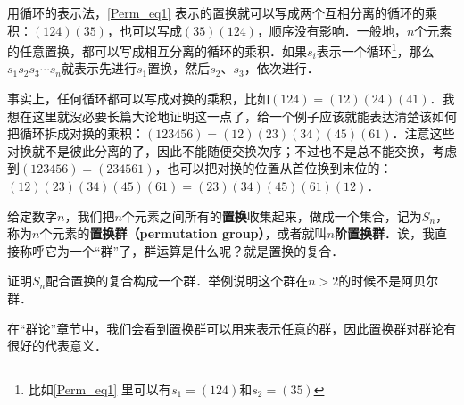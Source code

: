 用循环的表示法，\autoref{Perm_eq1}  表示的置换就可以写成两个互相分离的循环的乘积：$(1 2 4)(3 5)$，也可以写成$(3 5 )(1 2 4)$，顺序没有影响．一般地，$n$个元素的任意置换，都可以写成相互分离的循环的乘积．如果$s_i$表示一个循环\footnote{比如\autoref{Perm_eq1} 里可以有$s_1=(1 2 4)$和$s_2=(3 5)$}，那么$s_1s_2s_3\cdots s_n$就表示先进行$s_1$置换，然后$s_2$、$s_3$，依次进行．

事实上，任何循环都可以写成对换的乘积，比如$(1 2 4)=(1 2)(2 4)(4 1)$．我想在这里就没必要长篇大论地证明这一点了，给一个例子应该就能表达清楚该如何把循环拆成对换的乘积：$(1 2 3 4 5 6)=(1 2)(2 3)(3 4)(4 5)(6 1)$．注意这些对换就不是彼此分离的了，因此不能随便交换次序；不过也不是总不能交换，考虑到$(1 2 3 4 5 6)=(2 3 4 5 6 1)$，也可以把对换的位置从首位换到末位的：$(1 2)(2 3)(3 4)(4 5)(6 1)=(2 3)(3 4)(4 5)(6 1)(1 2)$．

给定数字$n$，我们把$n$个元素之间所有的\textbf{置换}收集起来，做成一个集合，记为$S_n$，称为$n$个元素的\textbf{置换群（permutation group）}，或者就叫$n$\textbf{阶置换群}．诶，我直接称呼它为一个“群”了，群运算是什么呢？就是置换的复合．

\begin{exercise}{}
证明$S_n$配合置换的复合构成一个群．举例说明这个群在$n>2$的时候不是阿贝尔群．
\end{exercise}

在“群论”章节中，我们会看到置换群可以用来表示任意的群，因此置换群对群论有很好的代表意义．




